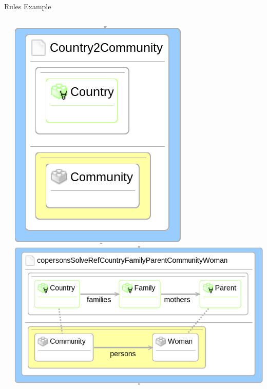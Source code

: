 \documentclass[12pt, handout]{beamer}
\begin{document}
\begin{frame}{Rules Example}
\begin{columns}[T]
\begin{column}[T]{0.5\textwidth}
\begin{center}
     \end{center}
 \end{column}
     \begin{column}[T]{0.5\textwidth}
    \includegraphics[height=0.45\textheight]{figures/Country2Community} \newline
     \includegraphics[height=0.45\textheight]{figures/copersonsWoman}
 \end{column}
 \end{columns}
\end{frame}
\end{document}
